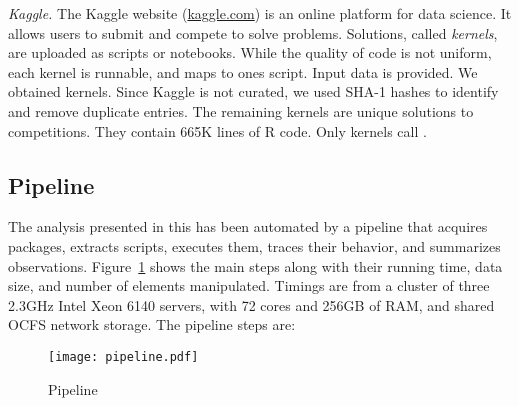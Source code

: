 \documentclass[review,screen,acmsmall,anonymous=true]{acmart}
\newcommand{\mypara}[1]{\medskip\noindent\emph{#1}\xspace}
\begin{document}
\mypara{Kaggle.} The Kaggle website ({\small \url{kaggle.com}}) is an online
platform for data science. It allows users to submit and compete to solve
problems. Solutions, called \emph{kernels}, are uploaded as scripts or
notebooks. While the quality of code is not uniform, each kernel is runnable,
and maps to ones script. Input data is provided. We obtained \KaggleKernels
kernels. Since Kaggle is not curated, we used SHA-1 hashes to identify and
remove \KaggleDuplicates duplicate entries. The remaining \KaggleUnique kernels
are unique solutions to \KaggleCompetitions competitions. They contain
665K lines of R code. Only \KaggleWithEvals kernels call \eval.

\subsection{Pipeline}

The analysis presented in this has been automated by a pipeline that acquires
packages, extracts scripts, executes them, traces their behavior, and summarizes observations. Figure~\ref{fig:pipeline} shows the main steps along
 with their running time, data size, and  number of elements manipulated.
  Timings are from a cluster of three 2.3GHz Intel Xeon 6140 servers, with 72 cores and 256GB of RAM, and shared OCFS network storage. The pipeline steps are:


\begin{figure}[!h]\hspace{-5mm}
  \texttt{[image: pipeline.pdf]}
  \caption{Pipeline}\label{fig:pipeline}
\end{figure}
\end{document}
